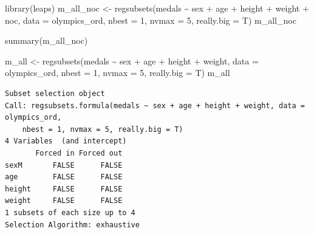 \documentclass[
  letterpaper,
  DIV=11,
  numbers=noendperiod]{scrartcl}
\newenvironment{Shaded}{\begin{snugshade}}{\end{snugshade}}
\newcommand{\AttributeTok}[1]{\textcolor[rgb]{0.40,0.45,0.13}{#1}}
\newcommand{\DecValTok}[1]{\textcolor[rgb]{0.68,0.00,0.00}{#1}}
\newcommand{\FunctionTok}[1]{\textcolor[rgb]{0.28,0.35,0.67}{#1}}
\newcommand{\NormalTok}[1]{\textcolor[rgb]{0.00,0.23,0.31}{#1}}
\newcommand{\OtherTok}[1]{\textcolor[rgb]{0.00,0.23,0.31}{#1}}
\newcommand{\SpecialCharTok}[1]{\textcolor[rgb]{0.37,0.37,0.37}{#1}}
\begin{document}
\begin{Shaded}
\end{Shaded}

\begin{Shaded}
\begin{Highlighting}[]
\FunctionTok{library}\NormalTok{(leaps)}
\NormalTok{m\_all\_noc }\OtherTok{\textless{}{-}} \FunctionTok{regsubsets}\NormalTok{(medals }\SpecialCharTok{\textasciitilde{}}\NormalTok{ sex  }\SpecialCharTok{+}\NormalTok{ age }\SpecialCharTok{+}\NormalTok{ height }\SpecialCharTok{+}\NormalTok{  weight }\SpecialCharTok{+}\NormalTok{ noc,}
                  \AttributeTok{data =}\NormalTok{ olympics\_ord, }
                  \AttributeTok{nbest =} \DecValTok{1}\NormalTok{, }\AttributeTok{nvmax =} \DecValTok{5}\NormalTok{, }\AttributeTok{really.big =}\NormalTok{ T)}
\NormalTok{m\_all\_noc}
\end{Highlighting}
\end{Shaded}

\begin{Shaded}
\begin{Highlighting}[]
\FunctionTok{summary}\NormalTok{(m\_all\_noc)}
\end{Highlighting}
\end{Shaded}

\begin{Shaded}
\begin{Highlighting}[]
\NormalTok{m\_all }\OtherTok{\textless{}{-}} \FunctionTok{regsubsets}\NormalTok{(medals }\SpecialCharTok{\textasciitilde{}}\NormalTok{ sex  }\SpecialCharTok{+}\NormalTok{ age }\SpecialCharTok{+}\NormalTok{ height }\SpecialCharTok{+}\NormalTok{  weight,}
                  \AttributeTok{data =}\NormalTok{ olympics\_ord, }
                  \AttributeTok{nbest =} \DecValTok{1}\NormalTok{, }\AttributeTok{nvmax =} \DecValTok{5}\NormalTok{, }\AttributeTok{really.big =}\NormalTok{ T)}
\NormalTok{m\_all}
\end{Highlighting}
\end{Shaded}

\begin{verbatim}
Subset selection object
Call: regsubsets.formula(medals ~ sex + age + height + weight, data = olympics_ord, 
    nbest = 1, nvmax = 5, really.big = T)
4 Variables  (and intercept)
       Forced in Forced out
sexM       FALSE      FALSE
age        FALSE      FALSE
height     FALSE      FALSE
weight     FALSE      FALSE
1 subsets of each size up to 4
Selection Algorithm: exhaustive
\end{verbatim}
\end{document}
